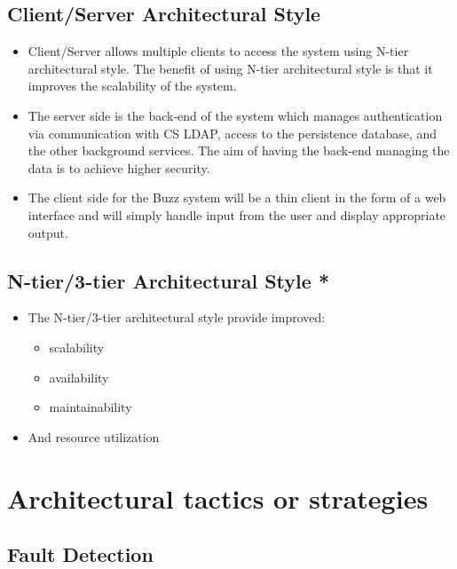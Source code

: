 \documentclass[12pt, oneside]{article}
\begin{document}
	\subsection{Client/Server Architectural Style}
	\begin{itemize}
		\item Client/Server allows multiple clients to access the system using N-tier architectural style. The benefit of using N-tier architectural style is that it improves the scalability of the system.
		\item The server side is the back-end of the system which manages authentication via communication with CS LDAP, access to the persistence database, and the other background services. The aim of having the back-end managing the data is to achieve higher security.
		\item The client side for the Buzz system will be a thin client in the form of a web interface and will simply handle input from the user and display appropriate output.
	\end{itemize}
	\subsection{N-tier/3-tier Architectural Style *}
	\begin{itemize}
		\item The N-tier/3-tier architectural style provide improved:
		\begin{itemize}
			\item scalability
			\item availability
			\item maintainability
		\end{itemize}
		\item And resource utilization
	\end{itemize}
\section{Architectural tactics or strategies}

	
	
	\subsection{Fault Detection}
\end{document}
